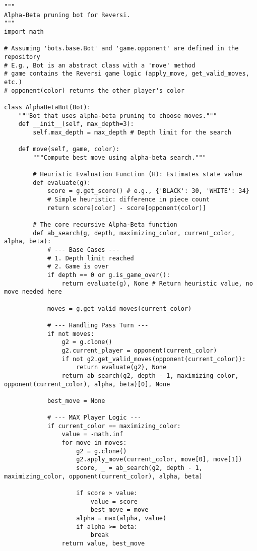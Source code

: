 \documentclass[11pt]{article}
\begin{document}
\begin{lstlisting}[style=pythonstyle]
"""
Alpha-Beta pruning bot for Reversi.
"""
import math

# Assuming 'bots.base.Bot' and 'game.opponent' are defined in the repository
# E.g., Bot is an abstract class with a 'move' method
# game contains the Reversi game logic (apply_move, get_valid_moves, etc.)
# opponent(color) returns the other player's color

class AlphaBetaBot(Bot):
    """Bot that uses alpha-beta pruning to choose moves."""
    def __init__(self, max_depth=3):
        self.max_depth = max_depth # Depth limit for the search

    def move(self, game, color):
        """Compute best move using alpha-beta search."""

        # Heuristic Evaluation Function (H): Estimates state value
        def evaluate(g):
            score = g.get_score() # e.g., {'BLACK': 30, 'WHITE': 34}
            # Simple heuristic: difference in piece count
            return score[color] - score[opponent(color)]

        # The core recursive Alpha-Beta function
        def ab_search(g, depth, maximizing_color, current_color, alpha, beta):
            # --- Base Cases ---
            # 1. Depth limit reached
            # 2. Game is over
            if depth == 0 or g.is_game_over():
                return evaluate(g), None # Return heuristic value, no move needed here

            moves = g.get_valid_moves(current_color)

            # --- Handling Pass Turn ---
            if not moves:
                g2 = g.clone()
                g2.current_player = opponent(current_color)
                if not g2.get_valid_moves(opponent(current_color)):
                    return evaluate(g2), None
                return ab_search(g2, depth - 1, maximizing_color, opponent(current_color), alpha, beta)[0], None

            best_move = None

            # --- MAX Player Logic ---
            if current_color == maximizing_color:
                value = -math.inf
                for move in moves:
                    g2 = g.clone()
                    g2.apply_move(current_color, move[0], move[1])
                    score, _ = ab_search(g2, depth - 1, maximizing_color, opponent(current_color), alpha, beta)

                    if score > value:
                        value = score
                        best_move = move
                    alpha = max(alpha, value)
                    if alpha >= beta:
                        break
                return value, best_move


\end{lstlisting}
\end{document}
